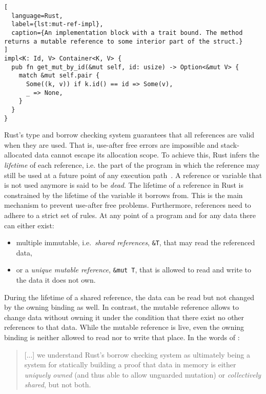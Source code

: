\begin{lstlisting}[
  language=Rust,
  label={lst:mut-ref-impl},
  caption={An implementation block with a trait bound. The method returns a mutable reference to some interior part of the struct.}
]
impl<K: Id, V> Container<K, V> {
  pub fn get_mut_by_id(&mut self, id: usize) -> Option<&mut V> {
    match &mut self.pair {
      Some((k, v)) if k.id() == id => Some(v),
      _ => None,
    }
  }
}
\end{lstlisting}

Rust's type and borrow checking system guarantees that all references are valid
when they are used. That is, use-after free errors are impossible and
stack-allocated data cannot escape its allocation scope. To achieve this, Rust
infers the \emph{lifetime} of each reference, i.e. the part of the program in
which the reference may still be used at a future point of any execution
path~\cite{wiki:live-vars}. A reference or variable that is not used anymore is
said to be \emph{dead}. The lifetime of a reference in Rust is constrained by
the lifetime of the variable it borrows from. This is the main  mechanism to
prevent use-after free problems. Furthermore, references need to adhere to a
strict set of rules. At any point of a program and for any data there can either
exist:


\begin{itemize}
\tightlist
\item multiple immutable, i.e.~\emph{shared references}, \lstinline!&T!,  that
may read the referenced data,

\item or a \emph{unique mutable reference}, \passthrough{\lstinline!&mut T!},
that is allowed to read and write to the data it does not own.
\end{itemize}

During the lifetime of a shared reference, the data can be read but not changed
by the owning binding as well. In contrast, the mutable reference allows to
change data without owning it under the condition that there exist no other
references to that data. While the mutable reference is live, even the owning
binding is neither allowed to read nor to write that place. In the words of
\citet{oxide}:

\begin{quote}
{[...]} we understand Rust's borrow checking system as ultimately being a system
for statically building a proof that data in memory is either
\emph{uniquely owned} (and thus able to allow unguarded mutation) or
\emph{collectively shared}, but not both.
\end{quote}

